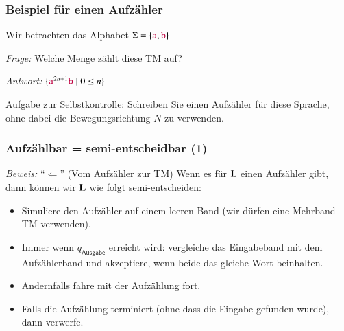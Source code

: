 \documentclass[onlymath]{beamer}
\begin{document}
\begin{frame}\frametitle{Beispiel für einen Aufzähler}

Wir betrachten das Alphabet $\Sigma=\{\mathtt{\textcolor{purple}{a}},\mathtt{\textcolor{purple}{b}}\}$

\begin{center}
\end{center}

\emph{Frage:} Welche Menge zählt diese TM auf?\pause\bigskip

\emph{Antwort:} $\{ \mathtt{\textcolor{purple}{a}}^{2n+1}\mathtt{\textcolor{purple}{b}}\mid 0\leq n\}$
\bigskip

Aufgabe zur Selbstkontrolle: Schreiben Sie einen Aufzähler für diese Sprache, ohne dabei die Bewegungsrichtung $N$ zu verwenden.

\end{frame}

\begin{frame}[t]\frametitle{Aufzählbar = semi-entscheidbar (1)}

\pause

\emph{Beweis:} "`$\Leftarrow$"' (Vom Aufzähler zur TM) Wenn es für $\textbf{\textcolor{black}{L}}$ einen Aufzähler
gibt, dann können wir $\textbf{\textcolor{black}{L}}$ wie folgt semi-entscheiden:
\begin{itemize}
\item Simuliere den Aufzähler auf einem leeren Band (wir dürfen eine Mehrband-TM verwenden).
\item Immer wenn $q_{\textsf{Ausgabe}}$ erreicht wird: vergleiche das Eingabeband mit dem Aufzählerband und akzeptiere, wenn beide das gleiche Wort beinhalten.
\item Andernfalls fahre mit der Aufzählung fort.
\item Falls die Aufzählung terminiert (ohne dass die Eingabe gefunden wurde), dann verwerfe.
\end{itemize}

\end{frame}
\end{document}
